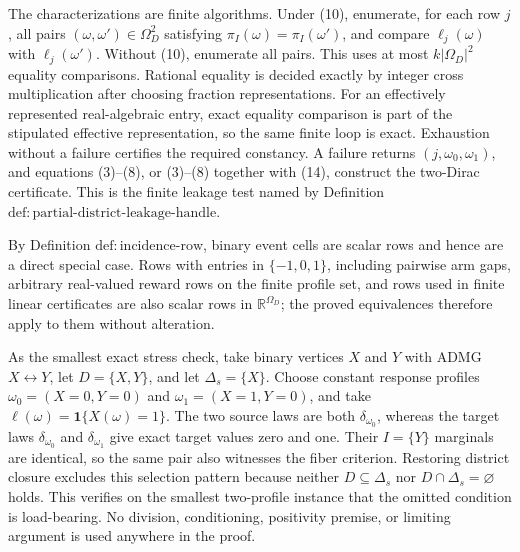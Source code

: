 The characterizations are finite algorithms.  Under (10), enumerate, for each row \(j\), all pairs \((\omega,\omega')\in\Omega_D^2\) satisfying \(\pi_I(\omega)=\pi_I(\omega')\), and compare \(\ell_j(\omega)\) with \(\ell_j(\omega')\).  Without (10), enumerate all pairs.  This uses at most \(k|\Omega_D|^2\) equality comparisons.  Rational equality is decided exactly by integer cross multiplication after choosing fraction representations.  For an effectively represented real-algebraic entry, exact equality comparison is part of the stipulated effective representation, so the same finite loop is exact.  Exhaustion without a failure certifies the required constancy.  A failure returns \((j,\omega_0,\omega_1)\), and equations (3)--(8), or (3)--(8) together with (14), construct the two-Dirac certificate.  This is the finite leakage test named by Definition \(\mathrm{def:partial\text{-}district\text{-}leakage\text{-}handle}\).

By Definition \(\mathrm{def:incidence\text{-}row}\), binary event cells are scalar rows and hence are a direct special case.  Rows with entries in \(\{-1,0,1\}\), including pairwise arm gaps, arbitrary real-valued reward rows on the finite profile set, and rows used in finite linear certificates are also scalar rows in \(\mathbb R^{\Omega_D}\); the proved equivalences therefore apply to them without alteration.

As the smallest exact stress check, take binary vertices \(X\) and \(Y\) with ADMG \(X\leftrightarrow Y\), let \(D=\{X,Y\}\), and let \(\Delta_s=\{X\}\).  Choose constant response profiles \(\omega_0=(X=0,Y=0)\) and \(\omega_1=(X=1,Y=0)\), and take \(\ell(\omega)=\mathbf 1\{X(\omega)=1\}\).  The two source laws are both \(\delta_{\omega_0}\), whereas the target laws \(\delta_{\omega_0}\) and \(\delta_{\omega_1}\) give exact target values zero and one.  Their \(I=\{Y\}\) marginals are identical, so the same pair also witnesses the fiber criterion.  Restoring district closure excludes this selection pattern because neither \(D\subseteq\Delta_s\) nor \(D\cap\Delta_s=\varnothing\) holds.  This verifies on the smallest two-profile instance that the omitted condition is load-bearing.  No division, conditioning, positivity premise, or limiting argument is used anywhere in the proof.
